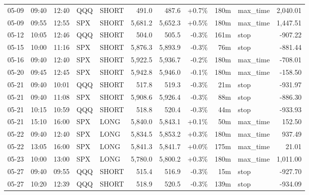 \documentclass[11pt,a4paper,twoside]{article}
\begin{document}
\begin{center}
\begin{longtable}{>{\color{txtmain}}l l l l l r r r r >{\color{txtmain}}l r}
05-09 & 09:40 & 12:40 & QQQ & SHORT & 491.0 & 487.6 & \textcolor{wingreen}{+0.7\%} & 180m & max\_time & \textcolor{wingreen}{2,040.01} \\
05-09 & 09:55 & 12:55 & SPX & SHORT & 5,681.2 & 5,652.3 & \textcolor{wingreen}{+0.5\%} & 180m & max\_time & \textcolor{wingreen}{1,447.51} \\
05-12 & 10:05 & 12:46 & QQQ & SHORT & 504.0 & 505.5 & \textcolor{lossred}{-0.3\%} & 161m & stop & \textcolor{lossred}{-907.22} \\
05-15 & 10:00 & 11:16 & SPX & SHORT & 5,876.3 & 5,893.9 & \textcolor{lossred}{-0.3\%} & 76m & stop & \textcolor{lossred}{-881.44} \\
05-16 & 09:40 & 12:40 & SPX & SHORT & 5,922.5 & 5,936.7 & \textcolor{lossred}{-0.2\%} & 180m & max\_time & \textcolor{lossred}{-708.01} \\
05-20 & 09:45 & 12:45 & SPX & SHORT & 5,942.8 & 5,946.0 & \textcolor{lossred}{-0.1\%} & 180m & max\_time & \textcolor{lossred}{-158.50} \\
05-21 & 09:40 & 10:01 & QQQ & SHORT & 517.8 & 519.3 & \textcolor{lossred}{-0.3\%} & 21m & stop & \textcolor{lossred}{-931.97} \\
05-21 & 09:40 & 11:08 & SPX & SHORT & 5,908.6 & 5,926.4 & \textcolor{lossred}{-0.3\%} & 88m & stop & \textcolor{lossred}{-886.30} \\
05-21 & 10:15 & 10:59 & QQQ & SHORT & 518.8 & 520.4 & \textcolor{lossred}{-0.3\%} & 44m & stop & \textcolor{lossred}{-933.93} \\
05-21 & 15:10 & 16:00 & SPX & LONG & 5,840.0 & 5,843.1 & \textcolor{wingreen}{+0.1\%} & 50m & max\_time & \textcolor{wingreen}{152.50} \\
05-22 & 09:40 & 12:40 & SPX & LONG & 5,834.5 & 5,853.2 & \textcolor{wingreen}{+0.3\%} & 180m & max\_time & \textcolor{wingreen}{937.49} \\
05-22 & 13:05 & 16:00 & SPX & LONG & 5,841.3 & 5,841.7 & \textcolor{wingreen}{+0.0\%} & 175m & max\_time & \textcolor{wingreen}{21.01} \\
05-23 & 10:00 & 13:00 & SPX & LONG & 5,780.0 & 5,800.2 & \textcolor{wingreen}{+0.3\%} & 180m & max\_time & \textcolor{wingreen}{1,011.00} \\
05-27 & 09:40 & 09:55 & QQQ & SHORT & 515.4 & 516.9 & \textcolor{lossred}{-0.3\%} & 15m & stop & \textcolor{lossred}{-927.70} \\
05-27 & 10:20 & 12:39 & QQQ & SHORT & 518.9 & 520.5 & \textcolor{lossred}{-0.3\%} & 139m & stop & \textcolor{lossred}{-934.09} \\

\end{longtable}
\end{center}
\end{document}
